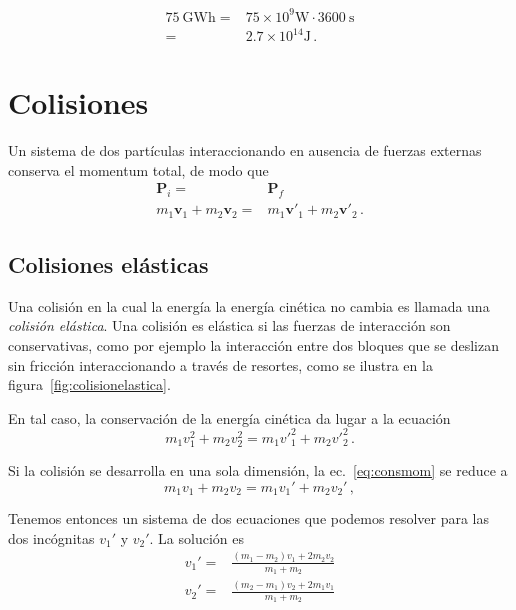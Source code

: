 \begin{align*}
  \SI{75}{\giga\watt\hour}=&75\times 10^9\si{\watt}\cdot \SI{3600}{\second}\nonumber\\
  =&2.7\times 10^{14}\si{\joule}\,.
\end{align*}



\section{Colisiones}
Un sistema de dos partículas interaccionando en ausencia de fuerzas externas conserva el momentum total, de modo que
\begin{align}
\label{eq:consmom}
  \mathbf{P}_i=&\mathbf{P}_f\nonumber\\
m_1\mathbf{v}_1+m_2\mathbf{v}_2=&m_1\mathbf{v}'_1+m_2\mathbf{v}'_2\,.
\end{align}


\subsection{Colisiones elásticas}
Una colisión en la cual la energía la energía cinética no cambia 
es llamada una \emph{colisión elástica}. Una colisión es elástica si
las fuerzas de interacción son conservativas, como por ejemplo la
interacción entre dos bloques que se deslizan sin fricción
interaccionando a través de resortes, como se ilustra en la
figura~\ref{fig:colisionelastica}.


\begin{frame}
En tal caso, la conservación de la energía cinética da lugar a la ecuación
\begin{equation}
\label{eq:E2}
  m_1 v^2_1 + m_2 v^2_2 = m_1 {v'}^2_1 + m_2 {v'}^2_2\,.
\end{equation}

Si la colisión se desarrolla en una sola dimensión, la ec.~\eqref{eq:consmom} se reduce a 
\begin{equation}\label{eq:E1}
  m_1 v_1 + m_2 v_2 = m_1 v_1' + m_2 v_2'\,,
\end{equation}

Tenemos entonces un sistema de dos ecuaciones que podemos resolver
para las dos incógnitas $v_1'$ y $v_2'$. La solución es
\begin{align}
  v_1' =& \frac{(m_1 - m_2)v_1 + 2m_2 v_2}{m_1 + m_2} \nonumber\\
  v_2' =& \frac{(m_2 - m_1)v_2 + 2m_1 v_1}{m_1+ m_2}
\end{align}
\end{frame}


